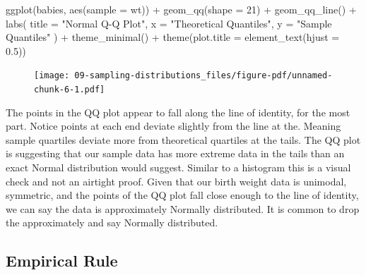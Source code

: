 \documentclass[
  letterpaper,
  DIV=11,
  numbers=noendperiod]{scrreprt}
\newenvironment{Shaded}{\begin{snugshade}}{\end{snugshade}}
\newcommand{\AttributeTok}[1]{\textcolor[rgb]{0.40,0.45,0.13}{#1}}
\newcommand{\DecValTok}[1]{\textcolor[rgb]{0.68,0.00,0.00}{#1}}
\newcommand{\FloatTok}[1]{\textcolor[rgb]{0.68,0.00,0.00}{#1}}
\newcommand{\FunctionTok}[1]{\textcolor[rgb]{0.28,0.35,0.67}{#1}}
\newcommand{\NormalTok}[1]{\textcolor[rgb]{0.00,0.23,0.31}{#1}}
\newcommand{\SpecialCharTok}[1]{\textcolor[rgb]{0.37,0.37,0.37}{#1}}
\newcommand{\StringTok}[1]{\textcolor[rgb]{0.13,0.47,0.30}{#1}}
\theoremstyle{definition}
\theoremstyle{remark}
\begin{document}
\begin{Shaded}
\begin{Highlighting}[]
\FunctionTok{ggplot}\NormalTok{(babies, }\FunctionTok{aes}\NormalTok{(}\AttributeTok{sample =}\NormalTok{ wt)) }\SpecialCharTok{+}
  \FunctionTok{geom\_qq}\NormalTok{(}\AttributeTok{shape =} \DecValTok{21}\NormalTok{) }\SpecialCharTok{+}
  \FunctionTok{geom\_qq\_line}\NormalTok{() }\SpecialCharTok{+}
  \FunctionTok{labs}\NormalTok{(}
    \AttributeTok{title =} \StringTok{"Normal Q{-}Q Plot"}\NormalTok{, }
    \AttributeTok{x =} \StringTok{"Theoretical Quantiles"}\NormalTok{,}
    \AttributeTok{y =} \StringTok{"Sample Quantiles"}
\NormalTok{    ) }\SpecialCharTok{+}
  \FunctionTok{theme\_minimal}\NormalTok{() }\SpecialCharTok{+}
  \FunctionTok{theme}\NormalTok{(}\AttributeTok{plot.title =} \FunctionTok{element\_text}\NormalTok{(}\AttributeTok{hjust =} \FloatTok{0.5}\NormalTok{))}
\end{Highlighting}
\end{Shaded}

\begin{figure}[H]

{\centering \texttt{[image: 09-sampling-distributions\_files/figure-pdf/unnamed-chunk-6-1.pdf]}

}

\end{figure}

The points in the QQ plot appear to fall along the line of identity, for
the most part. Notice points at each end deviate slightly from the line
at the. Meaning sample quartiles deviate more from theoretical quartiles
at the tails. The QQ plot is suggesting that our sample data has more
extreme data in the tails than an exact Normal distribution would
suggest. Similar to a histogram this is a visual check and not an
airtight proof. Given that our birth weight data is unimodal, symmetric,
and the points of the QQ plot fall close enough to the line of identity,
we can say the data is approximately Normally distributed. It is common
to drop the approximately and say Normally distributed.

\hypertarget{empirical-rule}{%
\subsection{Empirical Rule}\label{empirical-rule}}
\end{document}

